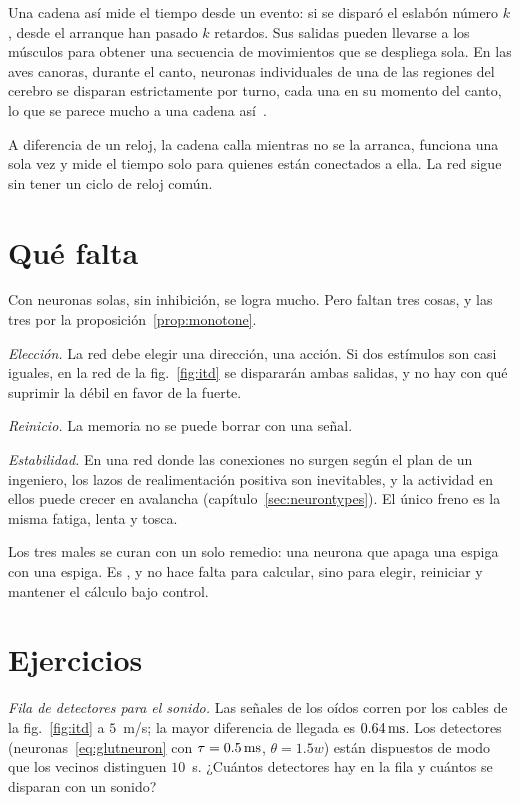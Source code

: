 Una cadena así mide el tiempo desde un evento: si se disparó el eslabón número $k$, desde el arranque han pasado $k$ retardos. Sus salidas pueden llevarse a los músculos para obtener una secuencia de movimientos que se despliega sola. En las aves canoras, durante el canto, neuronas  individuales de una de las regiones del cerebro se disparan estrictamente por turno, cada una en su momento del canto, lo que se parece mucho a una cadena así~\cite{Hahnloser2002}.

A diferencia de un reloj, la cadena calla mientras no se la arranca, funciona una sola vez y mide el tiempo solo para quienes están conectados a ella. La red sigue sin tener un ciclo de reloj común.

\section{Qué falta}

Con neuronas  solas, sin inhibición, se logra mucho. Pero faltan tres cosas, y las tres por la proposición~\ref{prop:monotone}.

\emph{Elección.} La red debe elegir una dirección, una acción. Si dos estímulos son casi iguales, en la red de la fig.~\ref{fig:itd} se dispararán ambas salidas, y no hay con qué suprimir la débil en favor de la fuerte.

\emph{Reinicio.} La memoria no se puede borrar con una señal.

\emph{Estabilidad.} En una red donde las conexiones no surgen según el plan de un ingeniero, los lazos de realimentación positiva son inevitables, y la actividad en ellos puede crecer en avalancha (capítulo~\ref{sec:neurontypes}). El único freno es la misma fatiga, lenta y tosca.

Los tres males se curan con un solo remedio: una neurona que apaga una espiga con una espiga. Es , y no hace falta para calcular, sino para elegir, reiniciar y mantener el cálculo bajo control.

\section{Ejercicios}

\begin{exercise}[\lvlA]
\label{ex:02:1}
\emph{Fila de detectores para el sonido.} Las señales de los oídos corren por los cables de la fig.~\ref{fig:itd} a $5$~m/s; la mayor diferencia de llegada es $0.64\,\text{ms}$. Los detectores (neuronas~\eqref{eq:glutneuron} con $\tau=0.5\,\text{ms}$, $\theta=1.5w$) están dispuestos de modo que los vecinos distinguen $10$~\textmu s. ¿Cuántos detectores hay en la fila y cuántos se disparan con un sonido?
\end{exercise}

